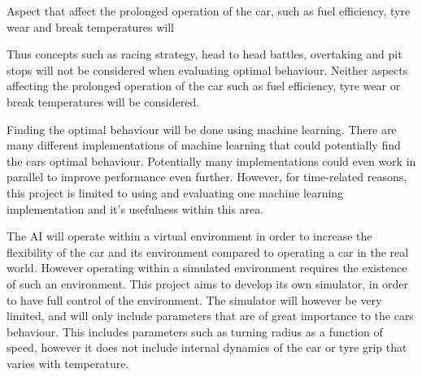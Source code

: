 Aspect that affect the prolonged operation of the car, such as fuel efficiency, tyre wear and break temperatures will 

Thus concepts such as racing strategy, head to head battles, overtaking and pit stops will not be considered when evaluating optimal behaviour. Neither aspects affecting the prolonged operation of the car such as fuel efficiency, tyre wear or break temperatures will be considered.

Finding the optimal behaviour will be done using machine learning. There are many different implementations of machine learning that could potentially find the cars optimal behaviour. Potentially many implementations could even work in parallel to improve performance even further. However, for time-related reasons, this project is limited to using and evaluating one machine learning implementation and it's usefulness within this area. 

The AI will operate within a virtual environment in order to increase the flexibility of the car and its environment compared to operating a car in the real world. However operating within a simulated environment requires the existence of such an environment. This project aims to develop its own simulator, in order to have full control of the environment. The simulator will however be very limited, and will only include parameters that are of great importance to the cars behaviour. This includes parameters such as turning radius as a function of speed, however it does not include internal dynamics of the car or tyre grip that varies with temperature.


